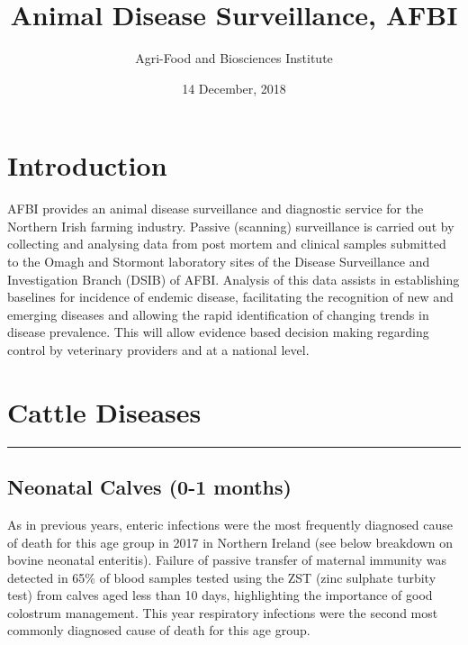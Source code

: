 \documentclass[]{book}
\title{Animal Disease Surveillance, AFBI}
\author{Agri-Food and Biosciences Institute}
\date{14 December, 2018}
\begin{document}
\maketitle

{
\setcounter{tocdepth}{1}
\tableofcontents
}
\chapter*{}\label{section}

\chapter{Introduction}\label{intro}

AFBI provides an animal disease surveillance and diagnostic service for
the Northern Irish farming industry. Passive (scanning) surveillance is
carried out by collecting and analysing data from post mortem and
clinical samples submitted to the Omagh and Stormont laboratory sites of
the Disease Surveillance and Investigation Branch (DSIB) of AFBI.
Analysis of this data assists in establishing baselines for incidence of
endemic disease, facilitating the recognition of new and emerging
diseases and allowing the rapid identification of changing trends in
disease prevalence. This will allow evidence based decision making
regarding control by veterinary providers and at a national level.

\chapter{Cattle Diseases}\label{cattle-diseases}

\begin{center}\rule{0.5\linewidth}{\linethickness}\end{center}

\section{Neonatal Calves (0-1 months)}\label{neonatal-calves-0-1-months}

As in previous years, enteric infections were the most frequently
diagnosed cause of death for this age group in 2017 in Northern Ireland
(see below breakdown on bovine neonatal enteritis). Failure of passive
transfer of maternal immunity was detected in 65\% of blood samples
tested using the ZST (zinc sulphate turbity test) from calves aged less
than 10 days, highlighting the importance of good colostrum management.
This year respiratory infections were the second most commonly diagnosed
cause of death for this age group.
\end{document}
